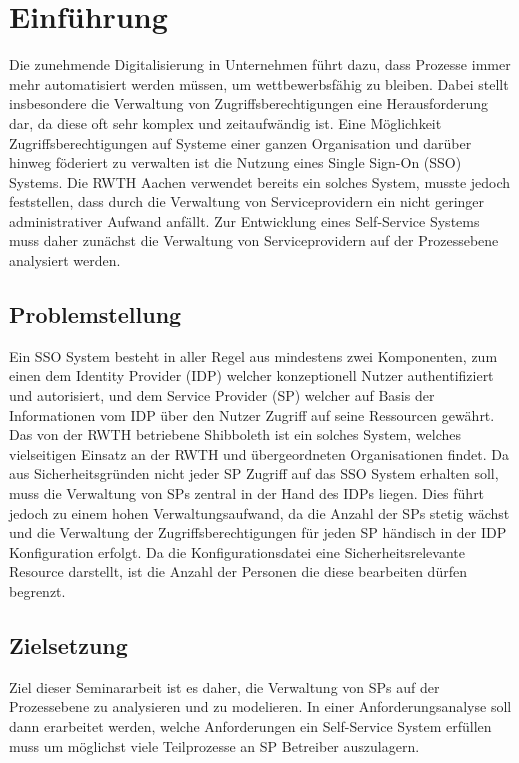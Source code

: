 \documentclass[11pt,a4paper]{scrartcl}
\begin{document}


\tableofcontents
\newpage


\section{Einführung}\label{sec:einfuehrung}
Die zunehmende Digitalisierung in Unternehmen führt dazu, dass Prozesse immer mehr automatisiert werden müssen, um wettbewerbsfähig zu bleiben.
Dabei stellt insbesondere die Verwaltung von Zugriffsberechtigungen eine Herausforderung dar, da diese oft sehr komplex und zeitaufwändig ist.
Eine Möglichkeit Zugriffsberechtigungen auf Systeme einer ganzen Organisation und darüber hinweg föderiert zu verwalten ist die Nutzung eines Single Sign-On (SSO) Systems.
Die RWTH Aachen verwendet bereits ein solches System, musste jedoch feststellen, dass durch die Verwaltung von Serviceprovidern ein nicht geringer administrativer Aufwand anfällt.
Zur Entwicklung eines Self-Service Systems muss daher zunächst die Verwaltung von Serviceprovidern auf der Prozessebene analysiert werden.

\subsection{Problemstellung}\label{subsec:problemstellung}
Ein SSO System besteht in aller Regel aus mindestens zwei Komponenten, zum einen dem Identity Provider (IDP) welcher konzeptionell Nutzer authentifiziert und autorisiert, und dem Service Provider (SP) welcher auf Basis der Informationen vom IDP über den Nutzer Zugriff auf seine Ressourcen gewährt.
Das von der RWTH betriebene Shibboleth ist ein solches System, welches vielseitigen Einsatz an der RWTH und übergeordneten Organisationen findet.
Da aus Sicherheitsgründen nicht jeder SP Zugriff auf das SSO System erhalten soll, muss die Verwaltung von SPs zentral in der Hand des IDPs liegen.
Dies führt jedoch zu einem hohen Verwaltungsaufwand, da die Anzahl der SPs stetig wächst und die Verwaltung der Zugriffsberechtigungen für jeden SP händisch in der IDP Konfiguration erfolgt.
Da die Konfigurationsdatei eine Sicherheitsrelevante Resource darstellt, ist die Anzahl der Personen die diese bearbeiten dürfen begrenzt.

\subsection{Zielsetzung}\label{subsec:zielsetzung}
Ziel dieser Seminararbeit ist es daher, die Verwaltung von SPs auf der Prozessebene zu analysieren und zu modelieren.
In einer Anforderungsanalyse soll dann erarbeitet werden, welche Anforderungen ein Self-Service System erfüllen muss um möglichst viele Teilprozesse an SP Betreiber auszulagern.
\end{document}

